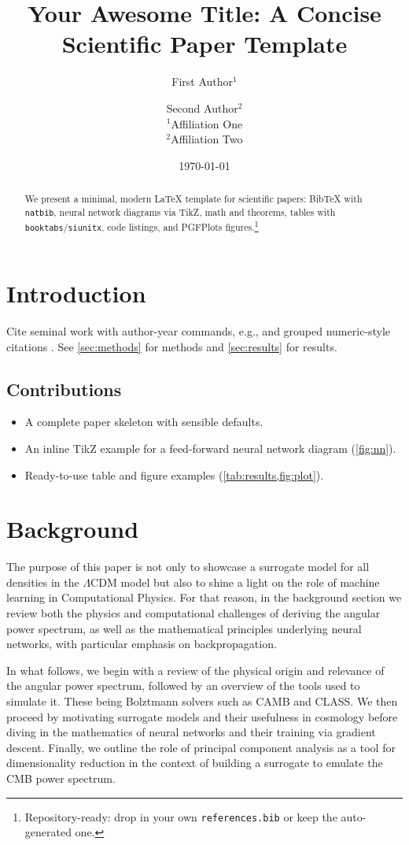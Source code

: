 \documentclass[11pt,a4paper]{article}
\title{Your Awesome Title: A Concise Scientific Paper Template}
\author{First Author$^{1}$ \and Second Author$^{2}$ \\
  \small $^{1}$Affiliation One \\ \small $^{2}$Affiliation Two}
\date{\today}
\numberwithin{equation}{section}
\begin{document}
\maketitle

\begin{abstract}
We present a minimal, modern \LaTeX{} template for scientific papers: Bib\TeX{} with \texttt{natbib}, neural network diagrams via TikZ, math and theorems, tables with \texttt{booktabs}/\texttt{siunitx}, code listings, and PGFPlots figures.\footnote{Repository-ready: drop in your own \texttt{references.bib} or keep the auto-generated one.}
\end{abstract}

\section{Introduction}
Cite seminal work with author-year commands, e.g., \citet{lecun2015deep} and grouped numeric-style citations \citep{kingma2014adam,he2016deep}. See \cref{sec:methods} for methods and \cref{sec:results} for results.

\subsection{Contributions}
\begin{itemize}
  \item A complete paper skeleton with sensible defaults.
  \item An inline TikZ example for a feed-forward neural network diagram (\cref{fig:nn}).
  \item Ready-to-use table and figure examples (\cref{tab:results,fig:plot}).
\end{itemize}

\section{Background}


The purpose of this paper is not only to showcase a surrogate model for all densities in the $\Lambda$CDM model but also to shine a light on the role of machine learning in Computational Physics. For that reason, in the background section we review both the physics and computational challenges of deriving the angular power spectrum, as well as the mathematical principles underlying neural networks, with particular emphasis on backpropagation. 

In what follows, we begin with a review of the physical origin and relevance of the angular power spectrum, followed by an overview of the tools used to simulate it. These being Bolztmann solvers such as CAMB and CLASS. 
We then proceed by motivating surrogate models and their usefulness in cosmology before diving in the mathematics of neural networks and their training via gradient descent. 
Finally, we outline the role of principal component analysis as a tool for dimensionality reduction in the context of building a surrogate to emulate the CMB power spectrum.
\end{document}

